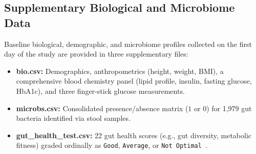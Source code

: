 \documentclass[12pt]{article}
\begin{document}
\subsection{Supplementary Biological and Microbiome Data}
Baseline biological, demographic, and microbiome profiles collected on the first day of the study are provided in three supplementary files:
\begin{itemize}[leftmargin=*, noitemsep]
    \item \textbf{{bio.csv}:} Demographics, anthropometrics (height, weight, BMI), a comprehensive blood chemistry panel (lipid profile, insulin, fasting glucose, HbA1c), and three finger-stick glucose measurements.
    \item \textbf{{microbs.csv}:} Consolidated presence/absence matrix ($1$ or $0$) for 1,979 gut bacteria identified via stool samples.
    \item \textbf{{gut\_health\_test.csv}:} 22 gut health scores (e.g., gut diversity, metabolic fitness) graded ordinally as \texttt{Good}, \texttt{Average}, or \texttt{Not Optimal}~\cite{tily2022overall}.
\end{itemize}

\vspace{0.8cm}
\end{document}
